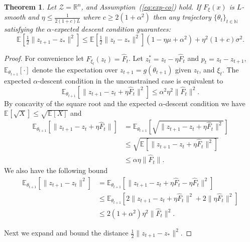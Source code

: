 \documentclass{article} %
\newtheorem{theorem}{Theorem}[section]
\theoremstyle{definition}
\newcommand{\reals}{\mathbb{R}}
\newcommand{\nnumbers}{\mathbb{N}}
\newcommand{\expect}[2][]{\mathbb{E}_{#1}\left[ #2\right]}
\begin{document}
{
\renewcommand{\thetheorem}{\ref{thm:stochastic}}
\begin{theorem}
Let $\mathcal{Z} = \reals^n$, and Assumption~(\ref{eq:exp-co}) hold.  
If $F_{\xi}(x)$  is $L$-smooth and $\eta \leq \frac{1}{2(1+c)L}$ where  $c \geq  2(1+\alpha^2)$  then any trajectory $\{\theta_t\}_{t\in \nnumbers}$ 
satisfying the $\alpha$-expected descent condition guarantees:
\[
\expect{\tfrac{1}{2}\|z_{t+1}-z_\ast\|^2} \leq \expect{\tfrac{1}{2}\|z_{t}-z_\ast\|^2}\left(1-\eta\mu + \alpha^2\right) +\eta^2(1+c)\sigma^2. 
\]
\end{theorem}
}
\begin{proof}
For convenience let $F_{\xi_t}(z_t) = \hat{F}_t$.
Let $z_t^\ast = z_t -\eta \hat{F}_t$ and $p_t = z_t-z_{t+1}$, $\expect[\theta_{t+1}]{\cdot}$ denote the expectation over $z_{t+1} =g(\theta_{t+1})$ given $z_t$, and $\xi_t$.
The expected $\alpha$-descent condition in the unconstrained case is equivalent to
\[
    \expect[\theta_{t+1}]{\|z_{t+1}-z_t + \eta \hat{F}_t\|^2} \leq \alpha^2 \eta^2 \|\hat{F}_t\|^2.
\]
By concavity of the square root and the  expected $\alpha$-descent condition we have $\expect{\sqrt{X}} \leq \sqrt{\expect{X}}$ and
\begin{align}
    \expect[\theta_{t+1}]{\|z_{t+1}-z_t +\eta \hat{F}_t\|} &= \expect[\theta_{t+1}]{\sqrt{\|z_{t+1}-z_t +\eta \hat{F}_t\|^2}} \\
    &\leq \sqrt{\expect{\|z_{t+1}-z_t +\eta \hat{F}_t\|^2}} \\
    &\leq \alpha \eta \|\hat{F}_t\|.\label{stoch_ineq_1}
\end{align}
We also have the following bound
\begin{align}
    \expect[\theta_{t+1}]{\|z_{t+1}-z_t\|^2} &= \expect[\theta_{t+1}]{\|z_{t+1}-z_t + \eta \hat{F}_t -  \eta \hat{F}_t\|^2}  \\ &\leq \expect[\theta_{t+1}]{2\|z_{t+1}-z_t + \eta \hat{F}_t\|^2 + 2\|\eta \hat{F}_t\|^2}\\
    &\leq 2(1+\alpha^2)\eta^2\|\hat{F}_t\|^2.\label{stoch_ineq_2}
\end{align}

Next we expand and bound the distance $\frac{1}{2}\|z_{t+1}-z_\ast\|^2$.


\end{proof}
\end{document}
